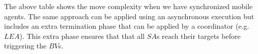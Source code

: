 The above table shows the move complexity  when we have synchronized mobile agents. The same approach can be applied using an asynchronous execution but includes an extra termination phase that can be applied by a coordinator (e.g. $LEA$). This extra phase ensures that  that  all $SA$s reach their targets before triggering the $BV$s.





